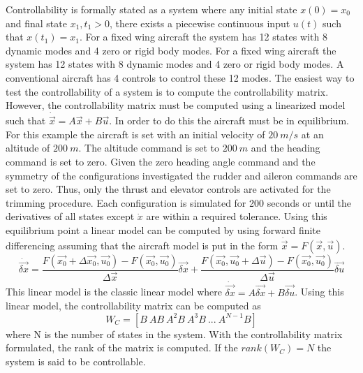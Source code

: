 Controllability is formally stated as a system where any initial
state $x(0)=x_0$ and final state $x_1,t_1>0$, there exists a piecewise
continuous input $u(t)$ such that $x(t_1)=x_1$. 
For a fixed wing aircraft the system has 12 states with 8 dynamic
modes and 4 zero or rigid body modes. For a fixed wing aircraft the system has 12 states with 8 dynamic
modes and 4 zero or rigid body modes. A conventional aircraft has 4
controls to control these 12 modes. The easiest way to test the 
controllability of a system  is to compute the
controllability matrix. However, the controllability matrix must be
computed using a linearized model such that
$\dot{\vec{x}}=A\vec{x}+B\vec{u}$. In order to do this the aircraft
must be in equilibrium. For this example the aircraft is
set with an initial velocity of $20~m/s$ at an altitude of
$200~m$. The altitude command is set to $200~m$ and the heading
command is set to zero. Given the zero heading angle command and the
symmetry of the configurations investigated the rudder and aileron
commands are set to zero. Thus, only the thrust and elevator controls
are activated for the trimming procedure. Each configuration is
simulated for 200 seconds or until the derivatives of all states
except $\dot{x}$ are within a required tolerance. Using this
equilibrium point a linear model can be computed by using forward
finite differencing assuming that the
aircraft model is put in the form $\dot{\vec{x}} = F(\vec{x},\vec{u})$.
\begin{equation}
\dot{\vec{\delta x}} = \frac{F(\vec{x_0}+\Delta \vec{x_0},\vec{u_0})-F(\vec{x_0},\vec{u_0})}{\Delta
  \vec{x}}\vec{\delta x} + \frac{F(\vec{x_0},\vec{u_0}+\Delta
  \vec{u})-F(\vec{x_0},\vec{u_0})}{\Delta \vec{u}}\vec{\delta u}
\end{equation}
This linear model is the classic linear model where
$\dot{\vec{\delta x}}=A\vec{\delta{x}}+B\vec{\delta{u}}$. Using this linear model, the
controllability matrix can be computed as
\begin{equation}
W_C = [B~AB~A^2B~A^3B~...~A^{N-1}B]
\end{equation}
where N is the number of states in the system. With the controllability
matrix formulated, the rank of the matrix is computed. If the
$rank(W_C)=N$ the system is said to be controllable.

